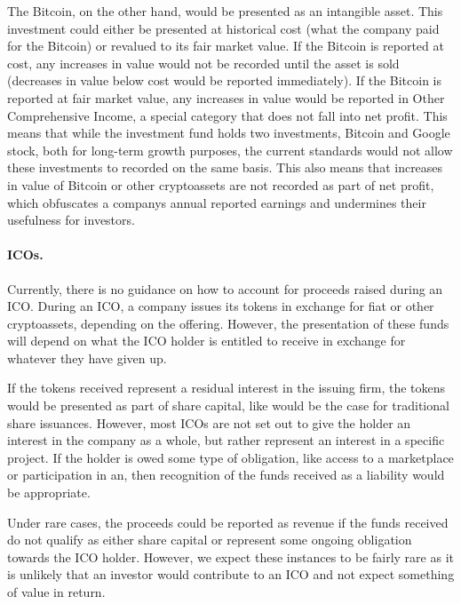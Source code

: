The Bitcoin, on the other hand, would be presented as an intangible asset. This investment could either be presented at historical cost (what the company paid for the Bitcoin) or revalued to its fair market value. If the Bitcoin is reported at cost, any increases in value would not be recorded until the asset is sold (decreases in value below cost would be reported immediately). If the Bitcoin is reported at fair market value, any increases in value would be reported in Other Comprehensive Income, a special category that does not fall into net profit. This means that while the investment fund holds two investments, Bitcoin and Google stock, both for long-term growth purposes, the current standards would not allow these investments to recorded on the same basis. This also means that increases in value of Bitcoin or other cryptoassets are not recorded as part of net profit, which obfuscates a company\textquotesingle s annual reported earnings and undermines their usefulness for investors. 

\paragraph{ICOs.} Currently, there is no guidance on how to account for proceeds raised during an ICO. During an ICO, a company issues its tokens in exchange for fiat or other cryptoassets, depending on the offering. However, the presentation of these funds will depend on what the ICO holder is entitled to receive in exchange for whatever they have given up.  

If the tokens received represent  a residual interest in the issuing firm, the tokens would be presented as part of share capital, like would be the case for traditional share issuances. However, most ICOs are not set out to give the holder an interest in the company as a whole, but rather represent an interest in a specific project. If the holder is owed some type of obligation, like access to a marketplace or participation in an, then recognition of the funds received as a liability would be appropriate. 

Under rare cases, the proceeds could be reported as revenue if the funds received do not qualify as either share capital or represent some ongoing obligation towards the ICO holder. However, we expect these instances to be fairly rare as it is unlikely that an investor would contribute to an ICO and not expect something of value in return. 

